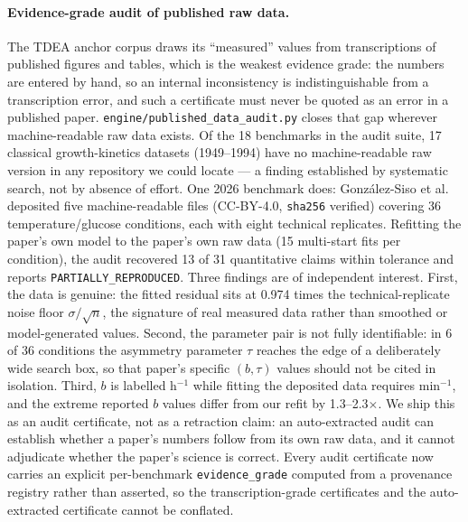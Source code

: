 \documentclass[review,3p]{elsarticle}
\begin{document}
\paragraph{Evidence-grade audit of published raw data.} The TDEA anchor corpus draws its ``measured'' values from transcriptions of published figures and tables, which is the weakest evidence grade: the numbers are entered by hand, so an internal inconsistency is indistinguishable from a transcription error, and such a certificate must never be quoted as an error in a published paper. \texttt{engine/published\_data\_audit.py} closes that gap wherever machine-readable raw data exists. Of the 18 benchmarks in the audit suite, 17 classical growth-kinetics datasets (1949--1994) have no machine-readable raw version in any repository we could locate --- a finding established by systematic search, not by absence of effort. One 2026 benchmark does: Gonz\'{a}lez-Siso et al.~\cite{gonzalezsiso2026ecoli} deposited five machine-readable files (CC-BY-4.0, \texttt{sha256} verified) covering 36 temperature/glucose conditions, each with eight technical replicates. Refitting the paper's own model to the paper's own raw data (15 multi-start fits per condition), the audit recovered 13 of 31 quantitative claims within tolerance and reports \texttt{PARTIALLY\_REPRODUCED}. Three findings are of independent interest. First, the data is genuine: the fitted residual sits at 0.974 times the technical-replicate noise floor $\sigma/\sqrt{n}$, the signature of real measured data rather than smoothed or model-generated values. Second, the parameter pair is not fully identifiable: in 6 of 36 conditions the asymmetry parameter $\tau$ reaches the edge of a deliberately wide search box, so that paper's specific $(b,\tau)$ values should not be cited in isolation. Third, $b$ is labelled h$^{-1}$ while fitting the deposited data requires min$^{-1}$, and the extreme reported $b$ values differ from our refit by 1.3--2.3$\times$. We ship this as an audit certificate, not as a retraction claim: an auto-extracted audit can establish whether a paper's numbers follow from its own raw data, and it cannot adjudicate whether the paper's science is correct. Every audit certificate now carries an explicit per-benchmark \texttt{evidence\_grade} computed from a provenance registry rather than asserted, so the transcription-grade certificates and the auto-extracted certificate cannot be conflated.

\end{document}
